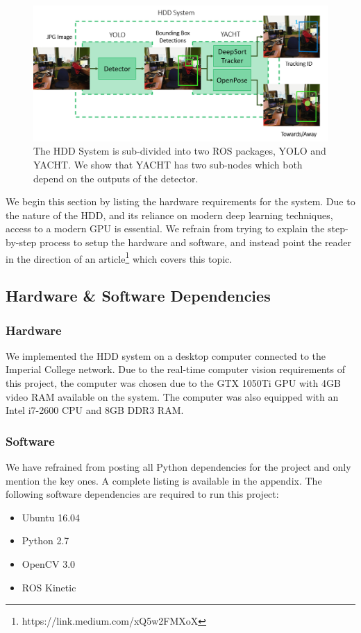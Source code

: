 \begin{figure}[ht]
	\centering
	\includegraphics[width=1.0\linewidth]{img/chapter5_implementation/hddSystemDiagram.png}
	\caption{The HDD System is sub-divided into two ROS packages, YOLO and YACHT. We show that YACHT has two sub-nodes which both depend on the outputs of the detector.}
	\label{fig:detailedHDD}
\end{figure}

We begin this section by listing the hardware requirements for the system. Due to the nature of the HDD, and its reliance on modern deep learning techniques, access to a modern GPU is essential. We refrain from trying to explain the step-by-step process to setup the hardware and software, and instead point the reader in the direction of an article\footnote{https://link.medium.com/xQ5w2FMXoX} which covers this topic.

\subsection{Hardware \& Software Dependencies}

\subsubsection{Hardware}
We implemented the HDD system on a desktop computer connected to the Imperial College network. Due to the real-time computer vision requirements of this project, the computer was chosen due to the GTX 1050Ti GPU with 4GB video RAM available on the system. The computer was also equipped with an Intel i7-2600 CPU and 8GB DDR3 RAM.

\subsubsection{Software}
We have refrained from posting all Python dependencies for the project and only mention the key ones. A complete listing is available in the appendix. The following software dependencies are required to run this project:
\begin{itemize}
	\item Ubuntu 16.04
	\item Python 2.7
	\item OpenCV 3.0
	\item ROS Kinetic
\end{itemize}

